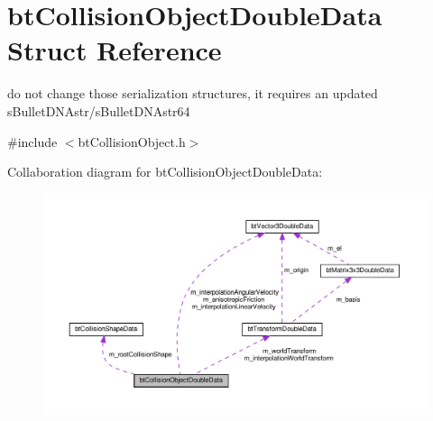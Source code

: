 \hypertarget{structbtCollisionObjectDoubleData}{}\section{bt\+Collision\+Object\+Double\+Data Struct Reference}
\label{structbtCollisionObjectDoubleData}


do not change those serialization structures, it requires an updated s\+Bullet\+D\+N\+Astr/s\+Bullet\+D\+N\+Astr64  




{\ttfamily \#include $<$bt\+Collision\+Object.\+h$>$}



Collaboration diagram for bt\+Collision\+Object\+Double\+Data\+:
\nopagebreak
\begin{figure}[H]
\begin{center}
\leavevmode
\includegraphics[width=350pt]{structbtCollisionObjectDoubleData__coll__graph}
\end{center}
\end{figure}
